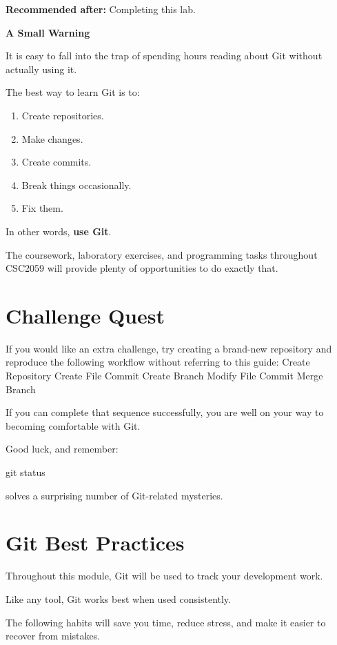 \documentclass{csc2059practical}
\begin{document}
\textbf{Recommended after:} Completing this lab.

\begin{importantnote}
\textbf{A Small Warning}\par
\medskip
It is easy to fall into the trap of spending hours reading about Git without actually using it.

The best way to learn Git is to:

\begin{enumerate}
  \item Create repositories.
  \item Make changes.
  \item Create commits.
  \item Break things occasionally.
  \item Fix them.
\end{enumerate}

In other words, \textbf{use Git}.

The coursework, laboratory exercises, and programming tasks throughout CSC2059 will provide plenty of opportunities to do exactly that.
\end{importantnote}
\section{Challenge Quest}
If you would like an extra challenge, try creating a brand-new repository and reproduce the following workflow without referring to this guide:
\VerticalWorkflowSeven
  {Create Repository}
  {Create File}
  {Commit}
  {Create Branch}
  {Modify File}
  {Commit}
  {Merge Branch}

If you can complete that sequence successfully, you are well on your way to becoming comfortable with Git.

Good luck, and remember:

\begin{terminalplain}
git status
\end{terminalplain}
solves a surprising number of Git-related mysteries.

\section{Git Best Practices}
Throughout this module, Git will be used to track your development work.

Like any tool, Git works best when used consistently.

The following habits will save you time, reduce stress, and make it easier to recover from mistakes.
\end{document}
